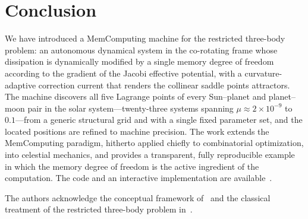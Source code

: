 \documentclass[aip,preprint,amsmath,amssymb,floatfix]{revtex4-2}
\begin{document}
\section{Conclusion}\label{sec:conclusion}

We have introduced a MemComputing machine for the restricted three-body problem: an
autonomous dynamical system in the co-rotating frame whose dissipation is
dynamically modified by a single memory degree of freedom according to the
gradient of the Jacobi effective potential, with a curvature-adaptive correction
current that renders the collinear saddle points attractors. The machine discovers
all five Lagrange points of every Sun--planet and planet--moon pair in the solar
system---twenty-three systems spanning $\mu\approx2\times10^{-9}$ to
$0.1$---from a generic structural grid and with a single fixed parameter set, and
the located positions are refined to machine precision. The work extends the
MemComputing paradigm, hitherto applied chiefly to combinatorial optimization,
into celestial mechanics, and provides a transparent, fully reproducible example
in which the memory degree of freedom is the active ingredient of the computation.
The code and an interactive implementation are available~\cite{github2026}.

\begin{acknowledgments}
The authors acknowledge the conceptual framework of~\cite{diventra2022} and the
classical treatment of the restricted three-body problem in~\cite{szebehely1967}.
\end{acknowledgments}
\end{document}

